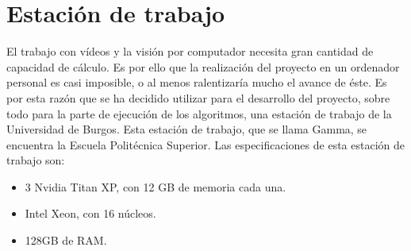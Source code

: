 \section{Estación de trabajo}
El trabajo con vídeos y la visión por computador necesita gran cantidad de capacidad de cálculo. Es por ello que la realización del proyecto en un ordenador personal es casi imposible, o al menos ralentizaría mucho el avance de éste. Es por esta razón que se ha decidido utilizar para el desarrollo del proyecto, sobre todo para la parte de ejecución de los algoritmos, una estación de trabajo de la Universidad de Burgos. Esta estación de trabajo, que se llama Gamma, se encuentra la Escuela Politécnica Superior. Las especificaciones de esta estación de trabajo son:
\begin{itemize}
	\item 3 Nvidia Titan XP, con 12 GB de memoria cada una.
	\item Intel Xeon, con 16 núcleos.
	\item 128GB de RAM.
\end{itemize}